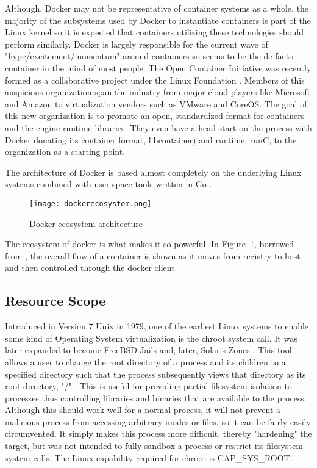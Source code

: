 Although, Docker may not be representative of container systems as a whole, the majority of the subsystems used by Docker to instantiate containers is part of the Linux kernel so it is expected that containers utilizing these technologies should perform similarly.  
Docker is largely responsible for the current wave of "hype/excitement/momentum" around containers so seems to be the de facto container in the mind of most people.  
The Open Container Initiative was recently formed as a collaborative project under the Linux Foundation \autocite{_oci_1}.
Members of this auspicious organization span the industry from major cloud players like Microsoft and Amazon to virtualization vendors such as VMware and CoreOS.  
The goal of this new organization is to promote an open, standardized format for containers and the engine runtime libraries. 
They even have a head start on the process with Docker donating its container format, libcontainer) and runtime, runC, to the organization as a starting point.

The architecture of Docker is based almost completely on the underlying Linux systems combined with user space tools written in Go \autocite{dockerarch1}. 
\begin{figure}
    \centering
    \texttt{[image: dockerecosystem.png]}
    \caption{Docker ecosystem architecture}
    \label{fig:dockerecosystem}
\end{figure}
The ecosystem of docker is what makes it so powerful.  
In Figure~\ref{fig:dockerecosystem}, borrowed from \autocite{dockerarch1}, the overall flow of a container is shown as it moves from registry to host and then controlled through the docker client.  


\subsection{Resource Scope}
\label{sec:resource_scope}

Introduced in Version 7 Unix in 1979, one of the earliest Linux systems to enable some kind of Operating System virtualization is the chroot system call.
It was later expanded to become FreeBSD Jails and, later, Solaris Zones \autocite{_zones_1}.  
This tool allows a user to change the root directory of a process and its children to a specified directory such that the process subsequently views that directory as its root directory, "/" .  
This is useful for providing partial filesystem isolation to processes thus controlling libraries and binaries that are available to the process.
Although this should work well for a normal process, it will not prevent a malicious process from accessing arbitrary inodes or files, so it can be fairly easily circumvented.
It simply makes this process more difficult, thereby "hardening" the target, but was not intended to fully sandbox a process or restrict its filesystem system calls.
The Linux capability required for chroot is CAP\_SYS\_ROOT. 


